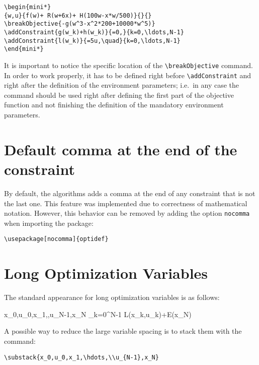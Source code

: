 \documentclass[a4paper]{article}
\begin{document}
\begin{lstlisting}
\begin{mini*}
{w,u}{f(w)+ R(w+6x)+ H(100w-x*w/500)}{}{}
\breakObjective{-g(w^3-x^2*200+10000*w^5)}
\addConstraint{g(w_k)+h(w_k)}{=0,}{k=0,\ldots,N-1}
\addConstraint{l(w_k)}{=5u,\quad}{k=0,\ldots,N-1}
\end{mini*}
\end{lstlisting}

It is important to notice the specific location of the \verb|\breakObjective| command. In order to work properly, it has to be defined right before \verb|\addConstraint| and right after the definition of the environment parameters; i.e.~in any case the command should be used right after defining the first part of the objective function and not finishing the definition of the mandatory environment parameters.

\section{Default comma at the end of the constraint}
\label{sec:comma}
By default, the algorithms adds a comma at the end of any constraint that is not the last one. This feature was implemented due to correctness of mathematical notation. However, this behavior can be removed by adding the option \verb|nocomma| when importing the package:

\begin{lstlisting}
\usepackage[nocomma]{optidef}
\end{lstlisting}



\section{Long Optimization Variables}
The standard appearance for long optimization variables is as follows:

\begin{mini!}
	{x_0,u_0,x_1,\hdots,u_{N-1},x_N}
	{\sum_{k=0}^{N-1} L(x_k,u_k)\!\!+\!\!E(x_N)\label{OCPobj}}
	{\label{eq:OCP}}{}
\end{mini!}

\noindent A possible way to reduce the large variable spacing is to stack them with the command: \begin{verbatim}
\substack{x_0,u_0,x_1,\hdots,\\u_{N-1},x_N}
\end{verbatim}
\end{document}
